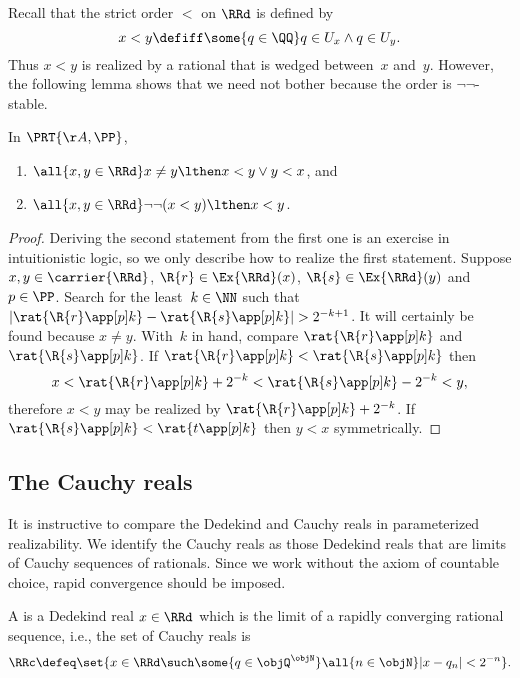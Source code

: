 Recall that the strict order $<$ on $\RRd$ is defined by
%
\begin{equation*}
  x < y \defiff
  \some{q \in \QQ} q \in U_x \land q \in U_y.
\end{equation*}
%
Thus $x < y$ is realized by a rational that is wedged between~$x$ and~$y$.
However, the following lemma shows that we need not bother because the order is $\neg\neg$-stable.

\begin{lemma}
  \label{lem:lt-stable}%
  In $\PRT{\AA, \PP}$,
  \begin{enumerate}
  \item $\all{x, y \in \RRd} x \neq y \lthen x < y \lor y < x$, and
  \item $\all{x, y \in \RRd} \neg \neg (x < y) \lthen x < y$.
  \end{enumerate}
\end{lemma}

\begin{proof}
  Deriving the second statement from the first one is an exercise in intuitionistic logic,
  so we only describe how to realize the first statement.
  Suppose $x, y \in \carrier{\RRd}$, $\R{r} \in \Ex{\RRd}(x)$, $\R{s} \in \Ex{\RRd}(y)$ and~$p \in \PP$.
  Search for the least~$k \in \NN$ such that $|\rat{\R{r} \app[p] k} - \rat{\R{s} \app[p] k}| > 2^{-k+1}$.
  It will certainly be found because $x \neq y$.
  With~$k$ in hand, compare $\rat{\R{r} \app[p] k}$ and $\rat{\R{s} \app[p] k}$.
  If $\rat{\R{r} \app[p] k} < \rat{\R{s} \app[p] k}$ then
  \begin{equation*}
    x < \rat{\R{r} \app[p] k} + 2^{-k}
      < \rat{\R{s} \app[p] k} - 2^{-k}
      < y,
  \end{equation*}
  therefore $x < y$ may be realized by $\rat{\R{r} \app[p] k} + 2^{-k}$.
  If $\rat{\R{s} \app[p] k} < \rat{t \app[p] k}$ then $y < x$ symmetrically.
\end{proof}


\subsection{The Cauchy reals}
\label{sec:cauchy-reals}
%
It is instructive to compare the Dedekind and Cauchy reals in parameterized realizability.
%
We identify the Cauchy reals as those Dedekind reals that are limits of Cauchy sequences of rationals. Since we work without the axiom of countable choice, rapid convergence should be imposed.

\begin{definition}
  \label{def:cauchy-real}
  A  is a Dedekind real $x \in \RRd$ which is the limit of a rapidly converging rational sequence, i.e., the set of Cauchy reals is
  \begin{equation*}
    \RRc \defeq \set{x \in \RRd \such \some{q \in \objQ^\objN} \all{n \in \objN} |x - q_n| < 2^{-n}}.
  \end{equation*}
\end{definition}

